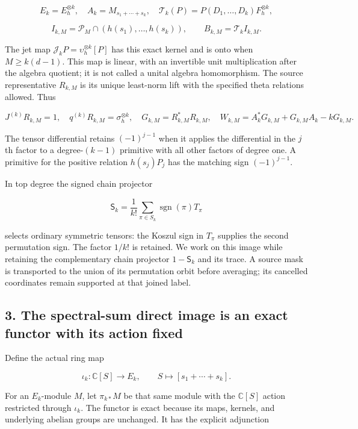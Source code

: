 \documentclass[
]{article}
\begin{document}
\[E_k=E_h^{\otimes k},\quad A_k=M_{s_1+\cdots+s_k},\quad
\mathcal T_k(P)=P(D_1,\ldots,D_k)F_h^{\otimes k},\]

\[I_{k,M}=\mathcal P_M\cap(h(s_1),\ldots,h(s_k)),\qquad B_{k,M}=\mathcal T_k I_{k,M}.\tag{2.4}\]

The jet map \(\mathcal J_kP=\upsilon_h^{\otimes k}[P]\) has this exact
kernel and is onto when \(M\ge k(d-1)\). This map is linear, with an
invertible unit multiplication after the algebra quotient; it is not
called a unital algebra homomorphism. The source representative
\(R_{k,M}\) is its unique least-norm lift with the specified theta
relations allowed. Thus

\[J^{(k)}R_{k,M}=1,\quad q^{(k)}R_{k,M}=\sigma_h^{\otimes k},\quad
G_{k,M}=R_{k,M}^*R_{k,M},\quad
W_{k,M}=A_k^*G_{k,M}+G_{k,M}A_k-kG_{k,M}.\tag{2.5}\]

The tensor differential retains \((-1)^{j-1}\) when it applies the
differential in the \(j\)th factor to a degree-\((k-1)\) primitive with
all other factors of degree one. A primitive for the positive relation
\(h(s_j)P_j\) has the matching sign \((-1)^{j-1}\).

In top degree the signed chain projector

\[\mathsf S_k=\frac1{k!}\sum_{\pi\in S_k}\operatorname{sgn}(\pi)T_\pi\tag{2.6}\]

selects ordinary symmetric tensors: the Koszul sign in \(T_\pi\)
supplies the second permutation sign. The factor \(1/k!\) is retained.
We work on this image while retaining the complementary chain projector
\(1-\mathsf S_k\) and its trace. A source mask is transported to the
union of its permutation orbit before averaging; its cancelled
coordinates remain supported at that joined label.

\subsection{3. The spectral-sum direct image is an exact functor with
its action
fixed}\label{the-spectral-sum-direct-image-is-an-exact-functor-with-its-action-fixed}

Define the actual ring map

\[\iota_k:\mathbb C[S]\longrightarrow E_k,\qquad S\longmapsto[s_1+\cdots+s_k].\tag{3.1}\]

For an \(E_k\)-module \(M\), let \(\pi_{k*}M\) be that same module with
the \(\mathbb C[S]\) action restricted through \(\iota_k\). The functor
is exact because its maps, kernels, and underlying abelian groups are
unchanged. It has the explicit adjunction
\end{document}
